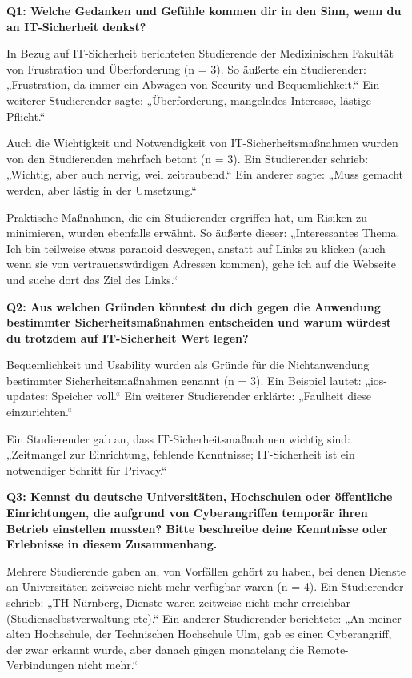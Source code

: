 \documentclass[german,report]{i1thesis}
\begin{document}
\textbf{Q1: Welche Gedanken und Gefühle kommen dir in den Sinn, wenn du an IT-Sicherheit denkst?}

In Bezug auf IT-Sicherheit berichteten Studierende der Medizinischen Fakultät von Frustration und Überforderung (n = 3). So äußerte ein Studierender: „Frustration, da immer ein Abwägen von Security und Bequemlichkeit.“ Ein weiterer Studierender sagte: „Überforderung, mangelndes Interesse, lästige Pflicht.“

Auch die Wichtigkeit und Notwendigkeit von IT-Sicherheitsmaßnahmen wurden von den Studierenden mehrfach betont (n = 3). Ein Studierender schrieb: „Wichtig, aber auch nervig, weil zeitraubend.“ Ein anderer sagte: „Muss gemacht werden, aber lästig in der Umsetzung.“

Praktische Maßnahmen, die ein Studierender ergriffen hat, um Risiken zu minimieren, wurden ebenfalls erwähnt. So äußerte dieser: „Interessantes Thema. Ich bin teilweise etwas paranoid deswegen, anstatt auf Links zu klicken (auch wenn sie von vertrauenswürdigen Adressen kommen), gehe ich auf die Webseite und suche dort das Ziel des Links.“

\textbf{Q2: Aus welchen Gründen könntest du dich gegen die Anwendung bestimmter Sicherheitsmaßnahmen entscheiden und warum würdest du trotzdem auf IT-Sicherheit Wert legen?}

Bequemlichkeit und Usability wurden als Gründe für die Nichtanwendung bestimmter Sicherheitsmaßnahmen genannt (n = 3). Ein Beispiel lautet: „ios-updates: Speicher voll.“ Ein weiterer Studierender erklärte: „Faulheit diese einzurichten.“

Ein Studierender gab an, dass IT-Sicherheitsmaßnahmen wichtig sind: „Zeitmangel zur Einrichtung, fehlende Kenntnisse; IT-Sicherheit ist ein notwendiger Schritt für Privacy.“

\textbf{Q3: Kennst du deutsche Universitäten, Hochschulen oder öffentliche Einrichtungen, die aufgrund von Cyberangriffen temporär ihren Betrieb einstellen mussten? Bitte beschreibe deine Kenntnisse oder Erlebnisse in diesem Zusammenhang.}

Mehrere Studierende gaben an, von Vorfällen gehört zu haben, bei denen Dienste an Universitäten zeitweise nicht mehr verfügbar waren (n = 4). Ein Studierender schrieb: „TH Nürnberg, Dienste waren zeitweise nicht mehr erreichbar (Studienselbstverwaltung etc).“ Ein anderer Studierender berichtete: „An meiner alten Hochschule, der Technischen Hochschule Ulm, gab es einen Cyberangriff, der zwar erkannt wurde, aber danach gingen monatelang die Remote-Verbindungen nicht mehr.“
\end{document}

